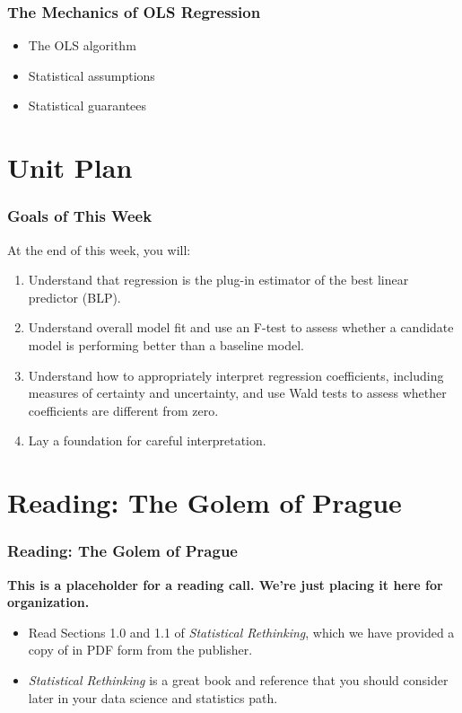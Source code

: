 \documentclass[12pt, block=fill]{beamer}
\begin{document}
\begin{frame}
  \frametitle{The Mechanics of OLS Regression}
  
  \begin{itemize}
\item The OLS algorithm
\item Statistical assumptions
\item Statistical guarantees
\end{itemize}
\end{frame}


\section{Unit Plan}


\begin{frame}
  \frametitle{Goals of This Week}
  At the end of this week, you will: 
  \begin{enumerate}
  \item Understand that regression is the plug-in estimator
    of the best linear predictor (BLP). 
  \item Understand overall model fit and use an F-test to assess
    whether a candidate model is performing better than a baseline
    model.
  \item Understand how to appropriately interpret regression
    coefficients, including measures of certainty and uncertainty, and
    use Wald tests to assess whether coefficients are different from zero.
  \item Lay a foundation for careful interpretation. 
  \end{enumerate}

\end{frame}


\section{Reading: The Golem of Prague}

\begin{frame}
  \frametitle{Reading: The Golem of Prague}
  \textbf{This is a placeholder for a reading call. We're just placing
    it here for organization.} 
  \begin{itemize}
  \item Read Sections 1.0 and 1.1 of \textit{Statistical Rethinking},
    which we have provided a copy of in PDF form from the publisher.
  \item \textit{Statistical Rethinking} is a great book and reference
    that you should consider later in your data science and statistics
    path.
  \end{itemize}
\end{frame}
\end{document}
